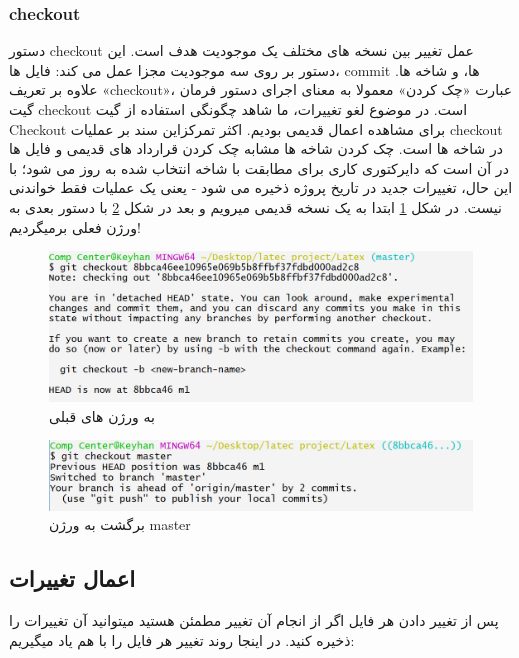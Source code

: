 \subsubsection{checkout}
دستور checkout عمل تغییر بین نسخه های مختلف یک موجودیت هدف است. این دستور بر روی سه موجودیت مجزا عمل می کند: فایل ها، commit ها، و شاخه ها. علاوه بر تعریف «checkout»، عبارت «چک کردن» معمولا به معنای اجرای دستور فرمان گیت checkout است. در موضوع لغو تغییرات، ما شاهد چگونگی استفاده از گیت  Checkout برای مشاهده اعمال قدیمی بودیم. اکثر تمرکزاین سند بر عملیات checkout در شاخه ها است.
\newline
چک کردن شاخه ها مشابه چک کردن قرارداد های قدیمی و فایل ها در آن است که دایرکتوری کاری برای مطابقت با شاخه انتخاب شده به روز می شود؛ با این حال، تغییرات جدید در تاریخ پروژه ذخیره می شود - یعنی یک عملیات فقط خواندنی نیست. \newline
در شکل \ref{Fig:GitCheckout} ابتدا به یک نسخه قدیمی میرویم و بعد در شکل \ref{Fig:GitCheckout2} با دستور بعدی به ورژن فعلی برمیگردیم!
\newline
\begin{figure}[tbh]
	\centering
	\includegraphics[width=1\textwidth]{./Figures/GitCheckout}
	\caption{ به ورژن های قبلی}
	\label{Fig:GitCheckout}
\end{figure}
\begin{figure}[tbh]
	\centering
	\includegraphics[width=1\textwidth]{./Figures/GitCheckout2}
	\caption{ برگشت به ورژن master }
	\label{Fig:GitCheckout2}
\end{figure}
\subsection{اعمال تغییرات}
پس از تغییر دادن هر فایل اگر از انجام آن تغییر مطمئن هستید میتوانید آن تغییرات را ذخیره کنید. در اینجا روند تغییر هر فایل را با هم یاد میگیریم:
